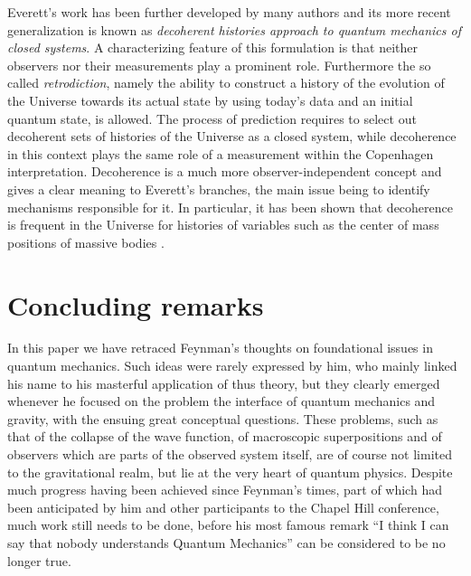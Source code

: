 \documentclass{ws-procs961x669}            %
\begin{document}
Everett's work has been further developed by many authors
\cite{dh1,dh2,dh3,dh4,dh5,dh6} and its more recent generalization
is known as \textit{decoherent histories approach to quantum
mechanics of closed systems}. A characterizing feature of this
formulation is that neither observers nor their measurements play
a prominent role. Furthermore the so called \textit{retrodiction},
namely the ability to construct a history of the evolution of the
Universe towards its actual state by using today's data and an
initial quantum state, is allowed. The process of prediction
requires to select out decoherent sets of histories of the
Universe as a closed system, while decoherence in this context
plays the same role of a measurement within the Copenhagen
interpretation. Decoherence is a much more observer-independent
concept and gives a clear meaning to Everett's branches, the main
issue being to identify mechanisms responsible for it. In
particular, it has been shown that decoherence is frequent in the
Universe for histories of variables such as the center of mass
positions of massive bodies \cite{Joos}.


\section{Concluding remarks}

In this paper we have retraced Feynman's thoughts on foundational
issues in quantum mechanics. Such ideas were rarely expressed by
him, who mainly linked his name to his masterful application of
thus theory, but they clearly emerged whenever he focused on the
problem the interface of quantum mechanics and gravity, with the
ensuing great conceptual questions. These problems, such as that
of the collapse of the wave function, of macroscopic
superpositions and of observers which are parts of the observed
system itself, are of course not limited to the gravitational
realm, but lie at the very heart of quantum physics. Despite much
progress having been achieved since Feynman's times, part of which
had been anticipated by him and other participants to the Chapel
Hill conference, much work still needs to be done, before his most
famous remark\cite{Messenger} ``I think I can say that nobody
understands Quantum Mechanics'' can be considered to be no longer
true.



%
%

\end{document}
